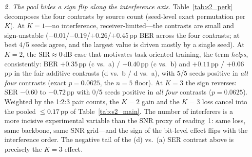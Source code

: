 \documentclass[review,12pt]{elsarticle}
\newcommand{\sir}{\mathrm{SIR}}
\begin{document}
\emph{2. The pool hides a sign flip along the interference axis.}
Table~\ref{tab:s2_perk} decomposes the four contrasts by source count
(seed-level exact permutation per $K$). At $K{=}1$---no interference,
receiver-limited---the contrasts are small and sign-unstable
($-0.01$/$-0.19$/$+0.26$/$+0.45$\,pp BER across the four contrasts; at
best 4/5 seeds agree, and the largest value is driven mostly by a
single seed). At $K{=}2$, the $\sir \approx 0$\,dB case that motivates
task-oriented training, the term \emph{helps}, consistently: BER
$+0.35$\,pp (c vs.\ a) / $+0.40$\,pp (c vs.\ b) and
$+0.11$\,pp / $+0.06$\,pp in the fair additive contrasts (d vs.\ b /
d vs.\ a), with 5/5 seeds
positive in \emph{all four} contrasts (exact $p = 0.0625$, the $n{=}5$
floor). At $K{=}3$ the sign reverses: SER $-0.60$ to $-0.72$\,pp with
0/5 seeds positive in \emph{all four} contrasts ($p = 0.0625$). Weighted
by the 1:2:3 pair counts, the $K{=}2$ gain and the $K{=}3$ loss cancel
into the pooled $\leq 0.17$\,pp of Table~\ref{tab:s2_main}. The number
of interferers is a more incisive experimental variable than the SNR
proxy of reading~1: same loss, same backbone, same SNR grid---and the
sign of the bit-level effect flips with the interference order. The
negative tail of the (d) vs.\ (a) SER contrast above is precisely the
$K{=}3$ effect.
\end{document}
